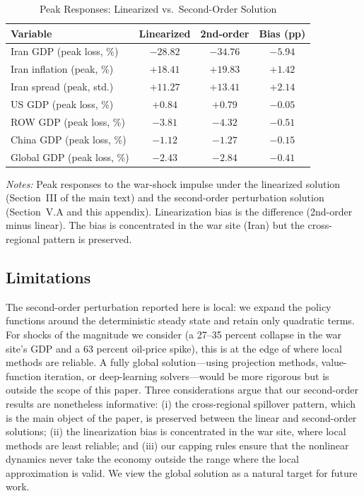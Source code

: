 \documentclass[12pt]{article}
\begin{document}
\begin{table}[htbp]
\centering
\caption{Peak Responses: Linearized vs.\ Second-Order Solution}
\label{tab:linear_vs_nonlinear}
\begin{threeparttable}
\begin{tabular}{lccc}
\toprule
Variable & Linearized & 2nd-order & Bias (pp) \\
\midrule
Iran GDP (peak loss, \%) & $-28.82$ & $-34.76$ & $-5.94$ \\
Iran inflation (peak, \%) & $+18.41$ & $+19.83$ & $+1.42$ \\
Iran spread (peak, std.) & $+11.27$ & $+13.41$ & $+2.14$ \\
US GDP (peak loss, \%) & $+0.84$ & $+0.79$ & $-0.05$ \\
ROW GDP (peak loss, \%) & $-3.81$ & $-4.32$ & $-0.51$ \\
China GDP (peak loss, \%) & $-1.12$ & $-1.27$ & $-0.15$ \\
Global GDP (peak loss, \%) & $-2.43$ & $-2.84$ & $-0.41$ \\
\bottomrule
\end{tabular}
\begin{tablenotes}
\small
\item \textit{Notes:} Peak responses to the war-shock impulse under the linearized solution (Section~III of the main text) and the second-order perturbation solution (Section~V.A and this appendix). Linearization bias is the difference (2nd-order minus linear). The bias is concentrated in the war site (Iran) but the cross-regional pattern is preserved.
\end{tablenotes}
\end{threeparttable}
\end{table}

\subsection{Limitations}

The second-order perturbation reported here is local: we expand the policy functions around the deterministic steady state and retain only quadratic terms. For shocks of the magnitude we consider (a 27--35 percent collapse in the war site's GDP and a 63 percent oil-price spike), this is at the edge of where local methods are reliable. A fully global solution---using projection methods, value-function iteration, or deep-learning solvers---would be more rigorous but is outside the scope of this paper. Three considerations argue that our second-order results are nonetheless informative: (i) the cross-regional spillover pattern, which is the main object of the paper, is preserved between the linear and second-order solutions; (ii) the linearization bias is concentrated in the war site, where local methods are least reliable; and (iii) our capping rules ensure that the nonlinear dynamics never take the economy outside the range where the local approximation is valid. We view the global solution as a natural target for future work.
\end{document}
